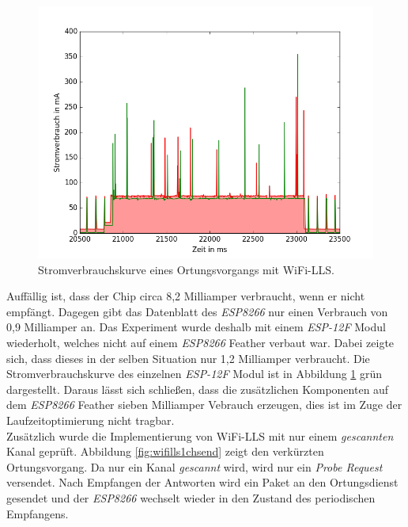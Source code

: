\begin{figure}[h!]
  \centering
	\includegraphics[width=\textwidth]{plots/wifillssendv.png}
  \caption{Stromverbrauchskurve eines Ortungsvorgangs mit WiFi-LLS.}
  \label{fig:wifillssendv}
\end{figure}

Auffällig ist, dass der Chip circa 8,2 Milliamper verbraucht, wenn er nicht empfängt. 
Dagegen gibt das Datenblatt des \emph{ESP8266} nur einen Verbrauch von 0,9 Milliamper an.
Das Experiment wurde deshalb mit einem \emph{ESP-12F} Modul wiederholt, welches nicht auf einem \emph{ESP8266} Feather verbaut war. 
Dabei zeigte sich, dass dieses in der selben Situation nur 1,2 Milliamper verbraucht.
Die Stromverbrauchskurve des einzelnen \emph{ESP-12F} Modul ist in Abbildung \ref{fig:wifillssendv} grün dargestellt.
Daraus lässt sich schließen, dass die zusätzlichen Komponenten auf dem \emph{ESP8266} Feather sieben Milliamper Vebrauch erzeugen, dies ist im Zuge der Laufzeitoptimierung nicht tragbar.\\
Zusätzlich wurde die Implementierung von WiFi-LLS mit nur einem \emph{gescannten} Kanal geprüft.
Abbildung \ref{fig:wifills1chsend} zeigt den verkürzten Ortungsvorgang.
Da nur ein Kanal \emph{gescannt} wird, wird nur ein \emph{Probe Request} versendet.
Nach Empfangen der Antworten wird ein Paket an den Ortungsdienst gesendet und der \emph{ESP8266} wechselt wieder in den Zustand des periodischen Empfangens.\\

